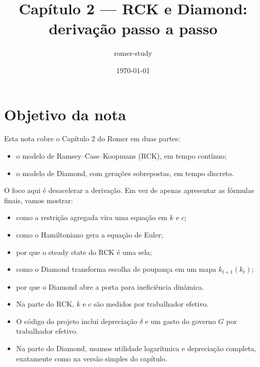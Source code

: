 \documentclass[11pt,a4paper]{article}
\title{Cap\'itulo 2 --- RCK e Diamond: deriva\c{c}\~ao passo a passo}
\author{romer-study}
\date{\today}
\begin{document}
\maketitle
\tableofcontents
\bigskip

\section{Objetivo da nota}

Esta nota cobre o Cap\'itulo 2 do Romer em duas partes:
\begin{itemize}
  \item o modelo de Ramsey--Cass--Koopmans (RCK), em tempo cont\'inuo;
  \item o modelo de Diamond, com gera\c{c}\~oes sobrepostas, em tempo discreto.
\end{itemize}

O foco aqui \'e desacelerar a deriva\c{c}\~ao. Em vez de apenas apresentar as
f\'ormulas finais, vamos mostrar:
\begin{itemize}
  \item como a restri\c{c}\~ao agregada vira uma equa\c{c}\~ao em \(k\) e \(c\);
  \item como o Hamiltoniano gera a equa\c{c}\~ao de Euler;
  \item por que o steady state do RCK \'e uma sela;
  \item como o Diamond transforma escolha de poupan\c{c}a em um mapa
  \(k_{t+1}(k_t)\);
  \item por que o Diamond abre a porta para inefici\^encia din\^amica.
\end{itemize}

\begin{convencao}
\begin{itemize}
  \item Na parte do RCK, \(k\) e \(c\) s\~ao medidos por trabalhador efetivo.
  \item O c\'odigo do projeto inclui deprecia\c{c}\~ao \(\delta\) e um gasto do governo \(G\) por trabalhador efetivo.
  \item Na parte do Diamond, usamos utilidade logar\'itmica e deprecia\c{c}\~ao completa, exatamente como na vers\~ao simples do cap\'itulo.
\end{itemize}
\end{convencao}
\end{document}
